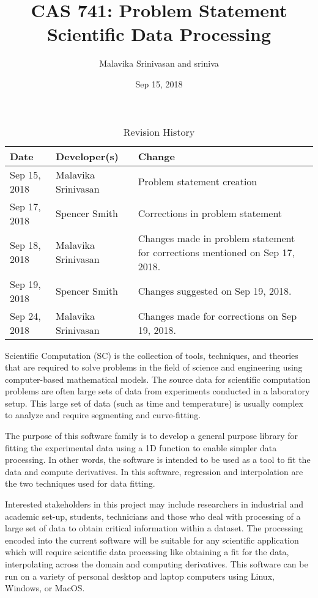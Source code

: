 \documentclass{article}
\title{CAS 741: Problem Statement\\ Scientific Data Processing}
\author{Malavika Srinivasan and sriniva}
\date{Sep 15, 2018}
\begin{document}
\maketitle

\begin{table}[hp]
\caption{Revision History} \label{TblRevisionHistory}
\begin{tabularx}{\textwidth}{llX}
\toprule
\textbf{Date} & \textbf{Developer(s)} & \textbf{Change}\\
\midrule
Sep 15, 2018 & Malavika Srinivasan & Problem statement creation\\
Sep 17, 2018 & Spencer Smith & Corrections in problem statement\\
Sep 18, 2018 & Malavika Srinivasan & 
Changes made in problem statement for corrections mentioned on Sep 17, 2018.\\
Sep 19, 2018& Spencer Smith & Changes suggested on Sep 19, 2018. \\
Sep 24, 2018& Malavika Srinivasan & Changes made for corrections on Sep 19, 2018. \\
\bottomrule
\end{tabularx}
\end{table}

Scientific Computation (SC) is the collection of tools, techniques, and theories
that are required to solve problems in the field of science and engineering
using computer-based mathematical models. The source data for scientific
computation problems are often large sets of data from experiments conducted in
a laboratory setup. This large set of data (such as time and temperature) is
usually complex to analyze and require segmenting and curve-fitting.

The purpose of this software family is to develop a general purpose library for
fitting the experimental data using a 1D function to enable simpler data
processing. In other words, the software is intended to be used as a tool to fit
the data and compute derivatives. In this software, regression and interpolation
are the two techniques used for data fitting.

Interested stakeholders in this project may include researchers in industrial
and academic set-up, students, technicians and those who deal with processing of
a large set of data to obtain critical information within a dataset. The
processing encoded into the current software will be suitable for any scientific
application which will require scientific data processing like obtaining a fit
for the data, interpolating across the domain and computing derivatives. This
software can be run on a variety of personal desktop and laptop computers using
Linux, Windows, or MacOS.





\end{document}
